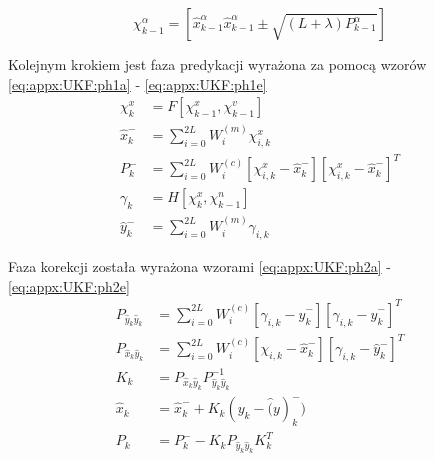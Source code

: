 \begin{equation}
\chi^\alpha_{k-1} = [\widehat{x}^\alpha_{k-1} \widehat{x}^\alpha_{k-1}\pm\sqrt{(L+\lambda)P^\alpha_{k-1}}] \label{eq:appx:UKF:ph0}
\end{equation}

Kolejnym krokiem jest faza predykacji wyrażona za pomocą wzorów \eqref{eq:appx:UKF:ph1a} - \eqref{eq:appx:UKF:ph1e}
\begin{subequations}
	\begin{align}
	\chi^x_{k}        & = F[\chi^x_{k-1},\chi^v_{k-1}] \label{eq:appx:UKF:ph1a}                                                               \\
	\widehat{x}^-_{k} & = \sum_{i=0}^{2L}W_i^{(m)}\chi^x_{i,k}\label{eq:appx:UKF:ph1b}                                                        \\
	P^-_k             & = \sum_{i=0}^{2L}W_i^{(c)}[\chi^x_{i,k}-\widehat{x}^-_{k}][\chi^x_{i,k}-\widehat{x}^-_{k}]^T \label{eq:appx:UKF:ph1c} \\
	\gamma_k          & = H[\chi^x_k, \chi^n_{k-1}] \label{eq:appx:UKF:ph1d}                                                                  \\
	\widehat{y}^-_{k} & = \sum_{i=0}^{2L}W_i^{(m)}\gamma_{i,k} \label{eq:appx:UKF:ph1e}                                                       
	\end{align}
\end{subequations}

Faza korekcji została wyrażona wzorami \eqref{eq:appx:UKF:ph2a} - \eqref{eq:appx:UKF:ph2e}
\begin{subequations}
	\begin{align}
	P_{\widehat{y}_k\widehat{y}_k} & = \sum_{i=0}^{2L}W_i^{(c)}[\gamma_{i,k} - \widehat{y}^-_k][\gamma_{i,k} - \widehat{y}^-_k]^T\label{eq:appx:UKF:ph2a} \\
	P_{\widehat{x}_k\widehat{y}_k} & = \sum_{i=0}^{2L}W_i^{(c)}[\chi_{i,k} - \widehat{x}^-_k][\gamma_{i,k} - \widehat{y}^-_k]^T\label{eq:appx:UKF:ph2b}   \\
	K_k                            & = P_{\widehat{x}_k\widehat{y}_k} P^{-1}_{\widehat{y}_k\widehat{y}_k} \label{eq:appx:UKF:ph2c}                        \\
	\widehat{x}_k                  & = \widehat{x}^-_{k} + K_k(y_k - \widehat(y)^-_k) \label{eq:appx:UKF:ph2d}                                            \\
	P_k                            & = P^-_k - K_kP_{\widehat{y}_k\widehat{y}_k}K_k^T \label{eq:appx:UKF:ph2e}                                            
	\end{align}
\end{subequations}

